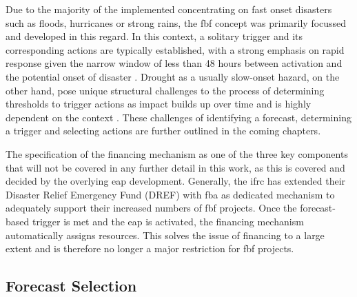 Due to the majority of the implemented  concentrating on fast onset disasters such as floods, hurricanes or strong rains, the \acrlong{fbf} concept was primarily focussed and developed in this regard. In this context, a solitary trigger and its corresponding actions are typically established, with a strong emphasis on rapid response given the narrow window of less than 48 hours between activation and the potential onset of disaster \autocite{rcrcForecastbasedFinancingEarly2020}. Drought as a usually slow-onset hazard, on the other hand, pose unique structural challenges to the process of determining thresholds to trigger actions as impact builds up over time and is highly dependent on the context \autocite{boultDroughtImpactbasedForecasting2022}. These challenges of identifying a forecast, determining a trigger and selecting actions are further outlined in the coming chapters.

The specification of the financing mechanism as one of the three key components that will not be covered in any further detail in this work, as this is covered and decided by the overlying \acrshort{eap} development. Generally, the \acrshort{ifrc} has extended their Disaster Relief Emergency Fund (DREF) with \acrfull{fba} as dedicated mechanism to adequately support their increased numbers of \acrshort{fbf} projects. Once the forecast-based trigger is met and the \acrshort{eap} is activated, the financing mechanism automatically assigns resources. This solves the issue of financing to a large extent and is therefore no longer a major restriction for \acrshort{fbf} projects.

\subsection{Forecast Selection}

